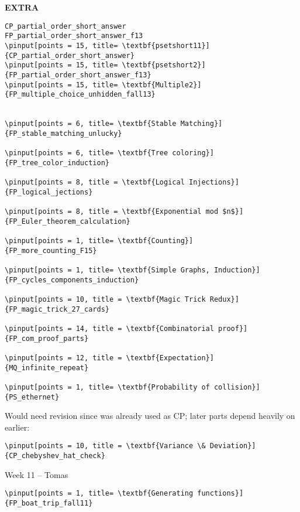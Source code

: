 \documentclass[quiz]{mcs}
\begin{document}

\begin{staffnotes}
\textbf{EXTRA}

\begin{verbatim}
CP_partial_order_short_answer
FP_partial_order_short_answer_f13
\pinput[points = 15, title= \textbf{psetshort11}]{CP_partial_order_short_answer}
\pinput[points = 15, title= \textbf{psetshort2}]{FP_partial_order_short_answer_f13}
\pinput[points = 15, title= \textbf{Multiple2}]{FP_multiple_choice_unhidden_fall13}


\pinput[points = 6, title= \textbf{Stable Matching}]
{FP_stable_matching_unlucky}

\pinput[points = 6, title= \textbf{Tree coloring}]
{FP_tree_color_induction}

\pinput[points = 8, title = \textbf{Logical Injections}]
{FP_logical_jections}

\pinput[points = 8, title = \textbf{Exponential mod $n$}]
{FP_Euler_theorem_calculation}

\pinput[points = 1, title= \textbf{Counting}]
{FP_more_counting_F15}

\pinput[points = 1, title= \textbf{Simple Graphs, Induction}]
{FP_cycles_components_induction}

\pinput[points = 10, title = \textbf{Magic Trick Redux}]
{FP_magic_trick_27_cards}

\pinput[points = 14, title = \textbf{Combinatorial proof}]
{FP_com_proof_parts}

\pinput[points = 12, title = \textbf{Expectation}]
{MQ_infinite_repeat}

\pinput[points = 1, title= \textbf{Probability of collision}]
{PS_ethernet}
\end{verbatim}

Would need revision since was already used as CP;
later parts depend heavily on earlier:

\begin{verbatim}
\pinput[points = 10, title = \textbf{Variance \& Deviation}]
{CP_chebyshev_hat_check}
\end{verbatim}

\begin{center}
{\large Week 11 -- Tomas}
\end{center}

\begin{verbatim}
\pinput[points = 1, title= \textbf{Generating functions}]
{FP_boat_trip_fall11}


\end{verbatim}
\end{staffnotes}
\end{document}
